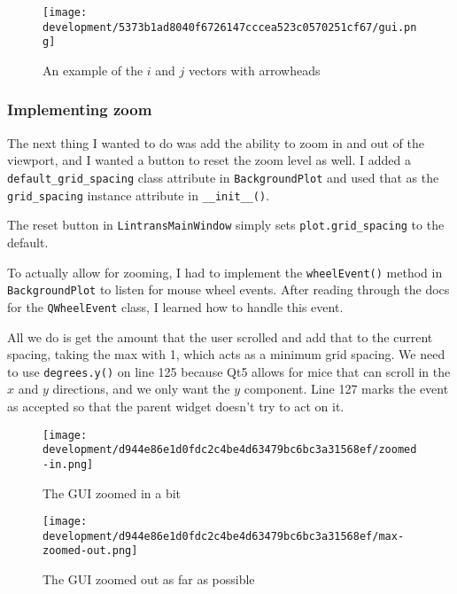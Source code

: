 \documentclass[../development.tex]{subfiles}
\begin{document}
\begin{figure}[H]
	\centering
	\texttt{[image: development/5373b1ad8040f6726147cccea523c0570251cf67/gui.png]}
	\caption{An example of the $i$ and $j$ vectors with arrowheads}
	\label{fig:development:5373b1ad8040f6726147cccea523c0570251cf67:gui.png}
\end{figure}

\subsubsection{Implementing zoom\label{development:improving-the-gui:implementing-zoom}}

The next thing I wanted to do was add the ability to zoom in and out of the viewport, and I wanted a button to reset the zoom level as well. I added a \texttt{default\_grid\_spacing} class attribute in \texttt{BackgroundPlot} and used that as the \texttt{grid\_spacing} instance attribute in \texttt{\_\_init\_\_()}.


The reset button in \texttt{LintransMainWindow} simply sets \texttt{plot.grid\_spacing} to the default.

To actually allow for zooming, I had to implement the \texttt{wheelEvent()} method in \texttt{BackgroundPlot} to listen for mouse wheel events. After reading through the docs for the \texttt{QWheelEvent} class\cite{qt5-docs-qwheelevent}, I learned how to handle this event.


All we do is get the amount that the user scrolled and add that to the current spacing, taking the max with 1, which acts as a minimum grid spacing. We need to use \texttt{degrees.y()} on line 125 because Qt5 allows for mice that can scroll in the $x$ and $y$ directions, and we only want the $y$ component. Line 127 marks the event as accepted so that the parent widget doesn't try to act on it.

\begin{figure}[H]
	\hspace{0.005\linewidth}
	\centering
	\begin{minipage}{0.48\linewidth}
		\centering
		\texttt{[image: development/d944e86e1d0fdc2c4be4d63479bc6bc3a31568ef/zoomed-in.png]}
		\caption{The GUI zoomed in a bit}
		\label{fig:development:d944e86e1d0fdc2c4be4d63479bc6bc3a31568ef:zoomed-in.png}
	\end{minipage}\hspace{0.015\linewidth}
	\begin{minipage}{0.48\linewidth}
		\centering
		\texttt{[image: development/d944e86e1d0fdc2c4be4d63479bc6bc3a31568ef/max-zoomed-out.png]}
		\caption{The GUI zoomed out as far as possible}
		\label{fig:development:d944e86e1d0fdc2c4be4d63479bc6bc3a31568ef:max-zoomed-out.png}
	\end{minipage}
	\hspace{0.005\linewidth}
	\vspace{-1em}
\end{figure}
\end{document}
